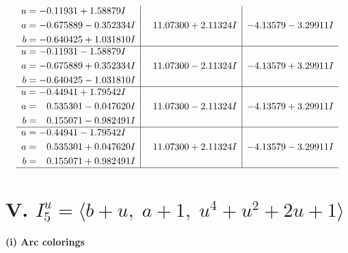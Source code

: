 \documentclass[1p]{elsarticle_modified}
\theoremstyle{definition}
\begin{document}
$$\begin{array}{c|c|c}
\begin{aligned}
u &= -0.11931 + 1.58879 I \\
a &= -0.675889 - 0.352334 I \\
b &= -0.640425 + 1.031810 I\end{aligned}
 & \phantom{-}11.07300 + 2.11324 I & -4.13579 - 3.29911 I \\ \hline\begin{aligned}
u &= -0.11931 - 1.58879 I \\
a &= -0.675889 + 0.352334 I \\
b &= -0.640425 - 1.031810 I\end{aligned}
 & \phantom{-}11.07300 - 2.11324 I & -4.13579 + 3.29911 I \\ \hline\begin{aligned}
u &= -0.44941 + 1.79542 I \\
a &= \phantom{-}0.535301 - 0.047620 I \\
b &= \phantom{-}0.155071 - 0.982491 I\end{aligned}
 & \phantom{-}11.07300 - 2.11324 I & -4.13579 + 3.29911 I \\ \hline\begin{aligned}
u &= -0.44941 - 1.79542 I \\
a &= \phantom{-}0.535301 + 0.047620 I \\
b &= \phantom{-}0.155071 + 0.982491 I\end{aligned}
 & \phantom{-}11.07300 + 2.11324 I & -4.13579 - 3.29911 I\\
 \hline 
 \end{array}$$\newpage\newpage\renewcommand{\arraystretch}{1}
\centering \section*{V. $I^u_{5}= \langle b+u,\;a+1,\;u^4+u^2+2 u+1 \rangle$}
\flushleft \textbf{(i) Arc colorings}\\
\end{document}

